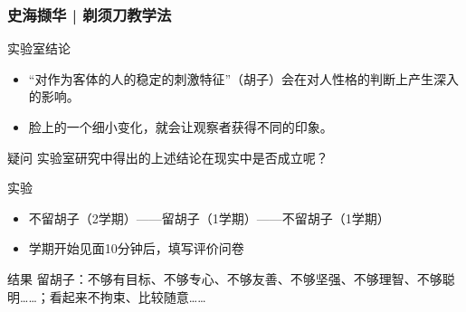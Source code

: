 \begin{frame}
  \frametitle{史海撷华 | 剃须刀教学法}
  \begin{block}{实验室结论}
    \begin{itemize}
      \item “对作为客体的人的稳定的刺激特征”（胡子）会在对人性格的判断上产生深入的影响。
      \item 脸上的一个细小变化，就会让观察者获得不同的印象。
    \end{itemize}
  \end{block}
  \vspace{-0.5em}
  \pause
  \begin{block}{疑问}
      实验室研究中得出的上述结论在现实中是否成立呢？
  \end{block}
  \vspace{-0.5em}
  \pause
  \begin{block}{实验}
    \begin{itemize}
      \item 不留胡子（2学期）——留胡子（1学期）——不留胡子（1学期）
      \item 学期开始见面10分钟后，填写评价问卷
    \end{itemize}
  \end{block}
  \vspace{-0.5em}
  \pause
  \begin{block}{结果}
留胡子：不够有目标、不够专心、不够友善、不够坚强、不够理智、不够聪明……；看起来不拘束、比较随意……
  \end{block}
\end{frame}

